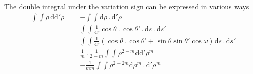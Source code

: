 The double integral under the variation sign can be expressed in various ways
\[
\begin{aligned}
\int\int\rho\,\mathrm d\mathrm d'\rho&=-\int\int\mathrm d\rho\,.\,\mathrm d'\rho\\
&=\int\int\frac{1}{4r}\cos\theta\,.\,\cos\theta'\,.\,\mathrm ds\,.\,\mathrm ds'\\
&=\int\int\frac{1}{4r}(\cos\theta\,.\,\cos\theta'+\sin\theta\sin\theta'\cos\omega)\mathrm ds\,.\,\mathrm ds'\\
&=\frac{1}{m}\,.\,\frac{1}{2-m}\int\int\rho^{2-m}\mathrm d\mathrm d'\rho^m\\
&=-\frac{1}{mm}\int\int\rho^{2-2m}\mathrm d\rho^m\,.\,\mathrm d'\rho^m
\end{aligned}
\]


